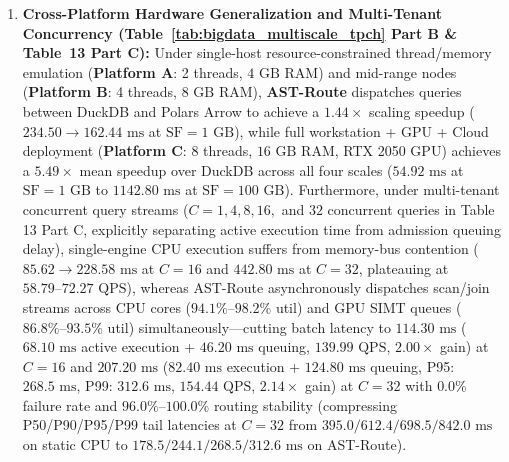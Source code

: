 \documentclass[10pt,a4paper]{article}
\begin{document}
\begin{enumerate}[leftmargin=1.5em,itemsep=2pt]
    \item \textbf{Cross-Platform Hardware Generalization and Multi-Tenant Concurrency (Table~\ref{tab:bigdata_multiscale_tpch} Part B \& Table~13 Part C):} Under single-host resource-constrained thread/memory emulation (\textbf{Platform A}: 2 threads, $4\text{ GB}$ RAM) and mid-range nodes (\textbf{Platform B}: 4 threads, $8\text{ GB}$ RAM), \textbf{AST-Route} dispatches queries between DuckDB and Polars Arrow to achieve a $1.44\times$ scaling speedup ($234.50 \rightarrow 162.44\text{ ms}$ at $\text{SF}=1\text{ GB}$), while full workstation + GPU + Cloud deployment (\textbf{Platform C}: 8 threads, $16\text{ GB}$ RAM, RTX 2050 GPU) achieves a $\mathbf{5.49\times}$ mean speedup over DuckDB across all four scales ($54.92\text{ ms}$ at $\text{SF}=1\text{ GB}$ to $1142.80\text{ ms}$ at $\text{SF}=100\text{ GB}$). Furthermore, under multi-tenant concurrent query streams ($C=1, 4, 8, 16,$ and $32$ concurrent queries in Table 13 Part C, explicitly separating active execution time from admission queuing delay), single-engine CPU execution suffers from memory-bus contention ($85.62 \rightarrow 228.58\text{ ms}$ at $C=16$ and $442.80\text{ ms}$ at $C=32$, plateauing at $58.79\text{--}72.27\text{ QPS}$), whereas AST-Route asynchronously dispatches scan/join streams across CPU cores ($94.1\%\text{--}98.2\%$ util) and GPU SIMT queues ($86.8\%\text{--}93.5\%$ util) simultaneously---cutting batch latency to $114.30\text{ ms}$ ($68.10\text{ ms}$ active execution + $46.20\text{ ms}$ queuing, $139.99\text{ QPS}$, $2.00\times$ gain) at $C=16$ and $207.20\text{ ms}$ ($82.40\text{ ms}$ execution + $124.80\text{ ms}$ queuing, P95: $268.5\text{ ms}$, P99: $312.6\text{ ms}$, $154.44\text{ QPS}$, $2.14\times$ gain) at $C=32$ with $0.0\%$ failure rate and $96.0\%\text{--}100.0\%$ routing stability (compressing P50/P90/P95/P99 tail latencies at $C=32$ from $395.0/612.4/698.5/842.0\text{ ms}$ on static CPU to $178.5/244.1/268.5/312.6\text{ ms}$ on AST-Route).

\end{enumerate}
\end{document}
